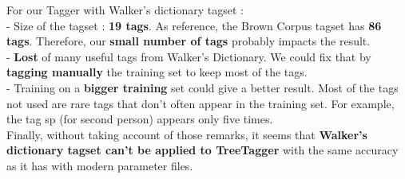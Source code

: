 \begin{center}
For our Tagger with Walker's dictionary tagset :\\[2mm]
- Size of the tagset : \textbf{19 tags}. As reference, the Brown Corpus tagset has \textbf{86 tags}. Therefore, our \textbf{small number of tags} probably impacts the result.\\

- \textbf{Lost} of many useful tags from Walker's Dictionary. 
We could fix that by \textbf{tagging manually} the training set to keep most of the tags.\\

- Training on a \textbf{bigger training} set could give a better result. Most of the tags not used are rare tags that don't often appear in the training set. For example, the tag sp (for second person) appears only five times.\\[2mm]

Finally, without taking account of those remarks, it seems that \textbf{Walker's dictionary tagset can't be applied to TreeTagger} with the same accuracy as it has with modern parameter files.
\end{center}

